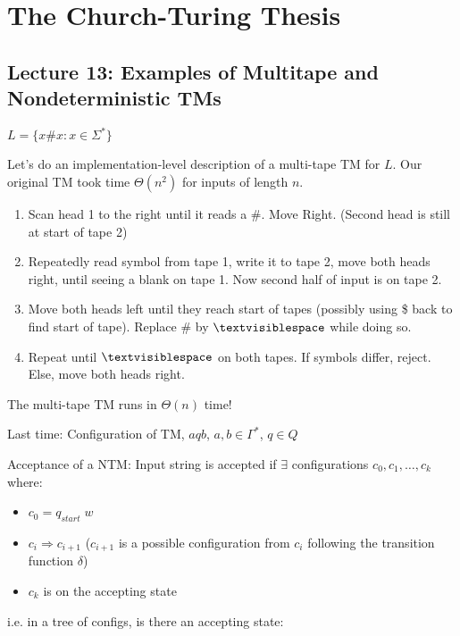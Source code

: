 \chapter{The Church-Turing Thesis}

\section*{Lecture 13: Examples of Multitape and Nondeterministic TMs}

\begin{example}
    $L = \{x\#x : x \in \Sigma^*\}$

    Let's do an implementation-level description of a multi-tape TM for $L$. Our original TM took time $\Theta(n^2)$ for inputs of length $n$.

    \begin{enumerate}
        \item Scan head 1 to the right until it reads a \#. Move Right. (Second head is still at start of tape 2)
        \item Repeatedly read symbol from tape 1, write it to tape 2, move both heads right, until seeing a blank on tape 1. Now second half of input is on tape 2.
        \item Move both heads left until they reach start of tapes (possibly using \$ back to find start of tape). Replace \# by $\textvisiblespace$ while doing so.
        \item Repeat until $\textvisiblespace$ on both tapes. If symbols differ, reject. Else, move both heads right.
    \end{enumerate}

    The multi-tape TM runs in $\Theta(n)$ time!
\end{example}

Last time: Configuration of TM, $aqb$, $a, b \in \Gamma^*$, $q \in Q$

Acceptance of a NTM: Input string is accepted if $\exists$ configurations $c_0, c_1, \ldots, c_k$ where:

\begin{itemize}
    \item $c_0 = q_{start} \; w$
    \item $c_i \Rightarrow c_{i+1}$ ($c_{i+1}$ is a possible configuration from $c_i$ following the transition function $\delta$)
    \item $c_k$ is on the accepting state
\end{itemize}

i.e. in a tree of configs, is there an accepting state:

